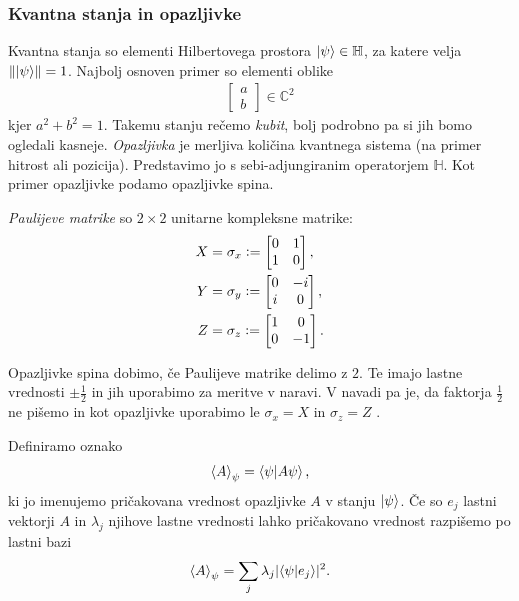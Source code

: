 \documentclass[mat1]{fmfdelo}
\newcommand{\C}{\mathbb C}
\newcommand{\Hb}{\mathbb H}
\newcommand{\defeq}{\vcentcolon=}
\begin{document}
\subsubsection{Kvantna stanja in opazljivke}
Kvantna stanja so elementi Hilbertovega prostora \(\ket\psi\in\Hb\), za katere velja \(\norm{\ket\psi} = 1\). Najbolj osnoven primer so elementi oblike 
\begin{align*}
    \begin{bmatrix}a\\b\end{bmatrix} \in \C^2
\end{align*}
kjer \(a^2 + b^2 = 1\). Takemu stanju rečemo \emph{kubit}, bolj podrobno pa si jih bomo ogledali kasneje. \emph{Opazljivka} je merljiva količina kvantnega sistema (na primer hitrost ali pozicija). Predstavimo jo s sebi-adjungiranim operatorjem \(\Hb\). Kot primer opazljivke podamo opazljivke spina.
\begin{definicija} \label{Pauli} \emph{Paulijeve matrike} so \(2\times 2\) unitarne kompleksne matrike:
    \begin{align*}
        X &= \sigma_x \defeq \begin{bmatrix}
            0&1\\
            1&0
        \end{bmatrix},\\
        Y &= \sigma_y \defeq \begin{bmatrix}
            0&-i\\
            i&0
        \end{bmatrix},\\
        Z &= \sigma_z \defeq \begin{bmatrix}
            1&0\\
            0&-1
        \end{bmatrix}.
    \end{align*}
\end{definicija}
Opazljivke spina dobimo, če Paulijeve matrike delimo z \(2\). Te imajo lastne vrednosti \(\pm \frac12\) in jih uporabimo za meritve v naravi. V navadi pa je, da faktorja \(\frac12\) ne pišemo in kot opazljivke uporabimo le \(\sigma_x = X\) in \(\sigma_z = Z\) \cite[Definicija 2.21]{mathforqm}.

 Definiramo oznako
\begin{align*}
    \ev{A}_\psi = \braket{\psi}{A\psi},
\end{align*}
ki jo imenujemo pričakovana vrednost opazljivke \(A\) v stanju \(\ket\psi\). Če so \(e_j\) lastni vektorji \(A\) in \(\lambda_j\) njihove lastne vrednosti lahko pričakovano vrednost razpišemo po lastni bazi
\begin{align*}
    \ev{A}_\psi = \sum_j\lambda_j\lvert \braket{\psi}{e_j}\rvert^2.
\end{align*}
\end{document}
